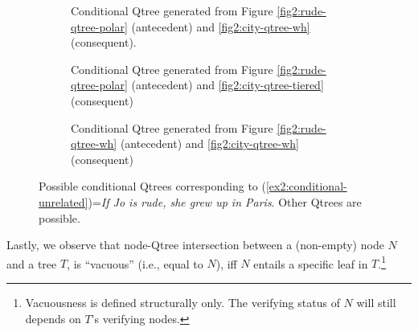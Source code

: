 \begin{figure}[H]
	\centering
	\begin{subfigure}[t]{\linewidth}
		\centering
	\caption{Conditional Qtree generated from Figure \ref{fig2:rude-qtree-polar} (antecedent) and \ref{fig2:city-qtree-wh} (consequent).}
	\end{subfigure}
	
	\begin{subfigure}[t]{\linewidth}
		\centering
	\caption{Conditional Qtree generated from Figure \ref{fig2:rude-qtree-polar} (antecedent) and \ref{fig2:city-qtree-tiered} (consequent)}
	\end{subfigure}
	
	\begin{subfigure}[t]{\linewidth}
		\centering
	\caption{Conditional Qtree generated from Figure \ref{fig2:rude-qtree-wh} (antecedent) and \ref{fig2:city-qtree-wh} (consequent)}
	\end{subfigure}
	\caption{Possible conditional Qtrees corresponding to (\ref{ex2:conditional-unrelated})=\textit{If Jo is rude, she grew up in Paris}. Other Qtrees are possible.}\label{fig2:qtree-if-rude-then-paris}
\end{figure}


Lastly, we observe that node-Qtree intersection between a (non-empty) node $N$ and a tree $T$, is ``vacuous'' (i.e., equal to $N$), iff $N$ entails a specific leaf in $T$.\footnote{Vacuousness is defined structurally only. The verifying status of $N$ will still depends on $T$'s verifying nodes.} 

